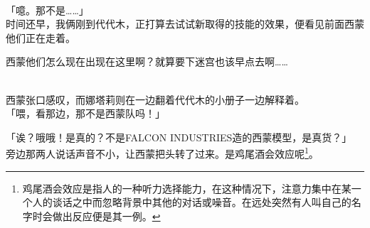 \sqsplit\\

「噫。那不是……」\\

时间还早，我俩刚到代代木，正打算去试试新取得的技能的效果，便看见前面西蒙他们正在走着。

西蒙他们怎么现在出现在这里啊？就算要下迷宫也该早点去啊……\\


\\

西蒙张口感叹，而娜塔莉则在一边翻着代代木的小册子一边解释着。\\

「喂，看那边，那不是西蒙队吗！」

「诶？哦哦！是真的？不是FALCON INDUSTRIES造的西蒙模型，是真货？」\\

旁边那两人说话声音不小，让西蒙把头转了过来。是鸡尾酒会效应呢\footnote{鸡尾酒会效应是指人的一种听力选择能力，在这种情况下，注意力集中在某一个人的谈话之中而忽略背景中其他的对话或噪音。在远处突然有人叫自己的名字时会做出反应便是其一例。}。\\

